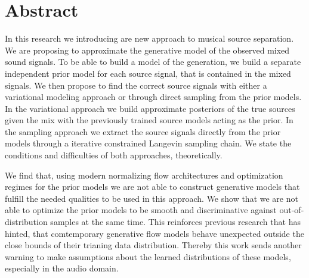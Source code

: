 \chapter{Abstract}%
\label{ch:abstract}

In this research we introducing are new approach to musical source separation. We are proposing to approximate the generative model of the observed mixed sound signals. To be able to build a model of the generation, we build a separate independent prior model for each source signal, that is contained in the mixed signals. We then propose to find the correct source signals with either a variational modeling approach or through direct sampling from the prior models. In the variational approach we build approximate posteriors of the true sources given the mix with the previously trained source models acting as the prior. In the sampling approach we extract the source signals directly from the prior models through a iterative constrained Langevin sampling chain. We state the conditions and difficulties of both approaches, theoretically.

We find that, using modern normalizing flow architectures and optimization regimes for the prior models we are not able to construct generative models that fulfill the needed qualities to be used in this approach. We show that we are not able to optimize the prior models to be smooth and discriminative against out-of-distribution samples at the same time. This reinforces previous research that has hinted, that comtemporary generative flow models behave unexpected outside the close bounds of their trianing data distribution. Thereby this work sends another warning to make assumptions about the learned distributions of these models, especially in the audio domain.
